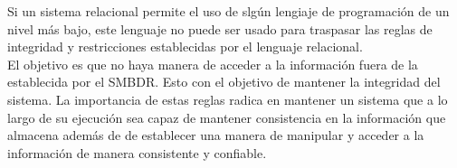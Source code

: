 \documentclass[a4paper, 12pt]{report}
\begin{document}
{\begin{enumerate}
{{    Si un sistema relacional permite el uso de slgún lengiaje de programación de
    un nivel más bajo, este lenguaje no puede ser usado para traspasar las reglas
    de integridad y restricciones establecidas por el lenguaje relacional.}\\
    El objetivo es que no haya manera de acceder a la información fuera de la
    establecida por el SMBDR. Esto con el objetivo de mantener la integridad
    del sistema.
}
La importancia de estas reglas radica en mantener un sistema que a lo largo de su
ejecución sea capaz de mantener consistencia en la información que almacena además
de de establecer una manera de manipular y acceder a la información de manera
consistente y confiable.\\


\end{enumerate}
}
\end{document}
